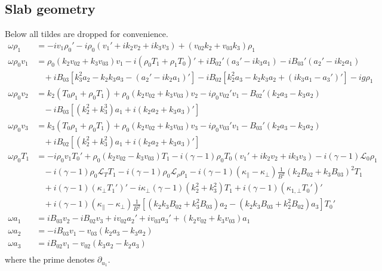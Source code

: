 \documentclass[11pt, fleqn]{article}
\newcommand{\HL}{\mathscr{L}}
\begin{document}
\subsection{Slab geometry}
Below all tildes are dropped for convenience.
\begin{equation}
	\begin{aligned}
		\omega \rho_1 		&= -iv_1\rho_0' - i\rho_0(v_1' + ik_2v_2 + ik_3v_3) + (v_{02}k_2 + v_{03}k_3)\rho_1																									\\[8pt]
		\omega \rho_0 v_1	&= \rho_0(k_2 v_{02} + k_3 v_{03})v_1 - i(\rho_0 T_1 + \rho_1 T_0)' + iB_{02}'(a_3' - ik_3a_1) - iB_{03}'(a_2' - ik_2a_1)															\\
							&~~~~ + iB_{03}\left[k_3^2a_2 - k_2k_3a_3 - (a_2' - ik_2a_1)'\right] - iB_{02}\left[k_2^2a_3 - k_2k_3a_2 + (ik_3a_1 - a_3')'\right]	 - ig\rho_1										\\[8pt]
		\omega \rho_0 v_2	&= k_2(T_0\rho_1 + \rho_0 T_1) + \rho_0(k_2 v_{02} + k_3v_{03})v_2 - i\rho_0v_{02}'v_1 - B_{02}'(k_2a_3 - k_3a_2) 																	\\
							&~~~~ - iB_{03}\left[(k_2^2 + k_3^3)a_1 + i(k_2a_2 + k_3a_3)'\right]																												\\[8pt]
		\omega \rho_0 v_3	&= k_3(T_0\rho_1 + \rho_0 T_1) + \rho_0(k_2 v_{02} + k_3v_{03})v_3 - i\rho_0v_{03}'v_1 - B_{03}'(k_2a_3 - k_3a_2)																	\\
							&~~~~ + iB_{02}\left[(k_2^2 + k_3^2)a_1 + i(k_2a_2 + k_3a_3)'\right]																												\\[8pt]
		\omega \rho_0 T_1	&= -i\rho_0v_1T_0' + \rho_0(k_2v_{02} - k_3v_{03})T_1 - i(\gamma - 1)\rho_0T_0(v_1' + ik_2v_2 + ik_3v_3) - i(\gamma - 1)\HL_0\rho_1													\\
							&~~~~ - i(\gamma - 1)\rho_0\HL_T T_1 - i(\gamma - 1)\rho_0\HL_\rho \rho_1 - i(\gamma - 1)(\kappa_\parallel - \kappa_\bot)\frac{1}{B^2}(k_2B_{02} + k_3B_{03})^2T_1					\\
							&~~~~ + i(\gamma - 1)(\kappa_\bot T_1')' - i\kappa_\bot(\gamma - 1)(k_2^2 + k_3^2)T_1 + i(\gamma - 1)(\kappa_{1, \bot}T_0')'														\\
							&~~~~ + i(\gamma - 1)(\kappa_\parallel - \kappa_\bot)\frac{1}{B^2}\left[(k_2k_3B_{02} + k_3^2B_{03})a_2 - (k_2k_3B_{03} + k_2^2B_{02})a_3\right]T_0'								\\[8pt]
		\omega a_1			&=  iB_{03}v_2 - iB_{02}v_3 + iv_{02}a_2' + iv_{03}a_3' + (k_2v_{02} + k_3v_{03})a_1																								\\[8pt]
		\omega a_2			&= -iB_{03}v_1 - v_{03}(k_2a_3 - k_3a_2)																																			\\[8pt]
		\omega a_3			&=  iB_{02}v_1 - v_{02}(k_3a_2 - k_2a_3)																																			\\
	\end{aligned}
\end{equation}
where the prime denotes $\partial_{u_1}$.
\end{document}
